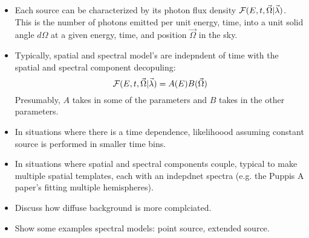 
\begin{itemize}
  \item
Each source can be characterized by its photon flux density 
  $\mathcal{F}(E,t,\vec\Omega|\vec\lambda)$.
This is the number of photons emitted per unit energy, time, into a unit solid angle $d\Omega$
at a given energy, time, and position $\vec\Omega$ in the sky.

\item Typically, spatial and spectral model's are indepndent of time
  with the spatial and spectral component decopuling:
  \begin{equation}
    \mathcal{F}(E,t,\vec\Omega|\vec\lambda) = A(E) B(\vec\Omega)
  \end{equation}
  Presumably, $A$ takes in some of the \modelparams parameters
  and $B$ takes in the other parameters.
\item In situations where there is a time dependence, likelihoood assuming constant
  source is performed in smaller time bins.
\item In situations where spatial and spectral components couple, typical to make
  multiple spatial templates, each with an indepdnet spectra (e.g. the Puppis A paper's
  fitting multiple hemispheres).
\item Discuss how diffuse background is more complciated.
\item Show some examples spectral models: point source, extended source.
\end{itemize}
